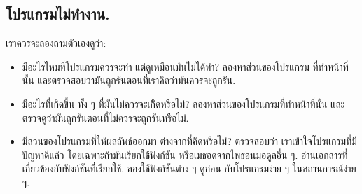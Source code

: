 \subsection{โปรแกรมไม่ทำงาน.}


เราควรจะลองถามตัวเองดูว่า:

\begin{itemize}


\item มีอะไรไหมที่โปรแกรมควรจะทำ
แต่ดูเหมือนมันไม่ได้ทำ?
ลองหาส่วนของโปรแกรม
ที่ทำหน้าที่นั้น
และตรวจสอบว่ามันถูกรันตอนที่เราคิดว่ามันควรจะถูกรัน.


\item มีอะไรที่เกิดขึ้น ทั้ง ๆ ที่มันไม่ควรจะเกิิดหรือไม่?
ลองหาส่วนของโปรแกรมที่ทำหน้าที่นั้น
และตรวจดูว่ามันถูกรันตอนที่ไม่ควรจะถูกรันหรือไม่.


\item มีส่วนของโปรแกรมที่ให้ผลลัพธ์ออกมา ต่างจากที่คิดหรือไม่?
ตรวจสอบว่า
เราเข้าใจโปรแกรมที่มีปัญหาดีแล้ว
โดยเฉพาะถ้ามันเรียกใช้ฟังก์ชัน หรือเมธอดจากไพธอนมอดูลอื่น ๆ.
อ่านเอกสารที่เกี่ยวข้องกับฟังก์ชันที่เรียกใช้.
ลองใช้ฟังก์ชันต่าง ๆ ดูก่อน กับโปรแกรมง่าย ๆ ในสถานการณ์ง่าย ๆ.


\end{itemize}


